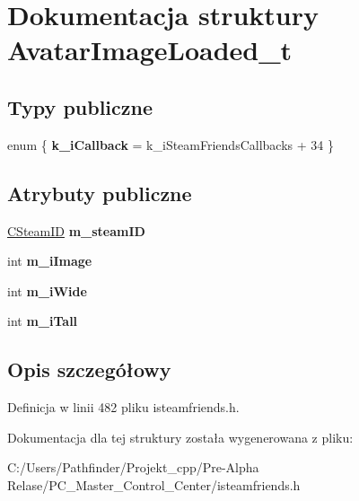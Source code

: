 \hypertarget{struct_avatar_image_loaded__t}{}\section{Dokumentacja struktury Avatar\+Image\+Loaded\+\_\+t}
\label{struct_avatar_image_loaded__t}
\subsection*{Typy publiczne}
\begin{DoxyCompactItemize}
\item 
\mbox{\label{struct_avatar_image_loaded__t_a0435ce68d99f8e83dcba7d78ac2f07bb}} 
enum \{ {\bfseries k\+\_\+i\+Callback} = k\+\_\+i\+Steam\+Friends\+Callbacks + 34
 \}
\end{DoxyCompactItemize}
\subsection*{Atrybuty publiczne}
\begin{DoxyCompactItemize}
\item 
\mbox{\label{struct_avatar_image_loaded__t_aaf3357e7ba676fc550df84df4ad9c1d3}} 
\hyperlink{class_c_steam_i_d}{C\+Steam\+ID} {\bfseries m\+\_\+steam\+ID}
\item 
\mbox{\label{struct_avatar_image_loaded__t_a0afad2841467161ace8f3c5cbd5fe000}} 
int {\bfseries m\+\_\+i\+Image}
\item 
\mbox{\label{struct_avatar_image_loaded__t_a05932408bc027edfd193a12cbf84a8e4}} 
int {\bfseries m\+\_\+i\+Wide}
\item 
\mbox{\label{struct_avatar_image_loaded__t_ad454a0571dbfd5afbf2556c35d7d557f}} 
int {\bfseries m\+\_\+i\+Tall}
\end{DoxyCompactItemize}


\subsection{Opis szczegółowy}


Definicja w linii 482 pliku isteamfriends.\+h.



Dokumentacja dla tej struktury została wygenerowana z pliku\+:\begin{DoxyCompactItemize}
\item 
C\+:/\+Users/\+Pathfinder/\+Projekt\+\_\+cpp/\+Pre-\/\+Alpha Relase/\+P\+C\+\_\+\+Master\+\_\+\+Control\+\_\+\+Center/isteamfriends.\+h\end{DoxyCompactItemize}
